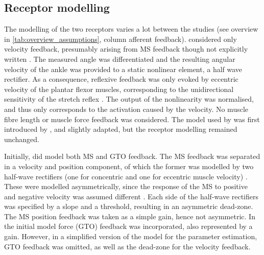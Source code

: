 
\subsection{Receptor modelling}
The modelling of the two receptors varies a lot between the studies (see overview in \autoref{tab:overview_assumptions}, column afferent feedback). \citeauthor{mirbagheri_intrinsic_2000} considered only velocity feedback, presumably arising from MS feedback though not explicitly written \cite{mirbagheri_intrinsic_2000}. The measured angle was differentiated and the resulting angular velocity of the ankle was provided to a static nonlinear element, a half wave rectifier. As a consequence, reflexive feedback was only evoked by eccentric velocity of the plantar flexor muscles, corresponding to the unidirectional sensitivity of the stretch reflex \cite{kearney_system_1983}. The output of the nonlinearity was normalised, and thus only corresponds to the activation caused by the velocity. No muscle fibre length or muscle force feedback was considered. The model used by \citeauthor{mirbagheri_intrinsic_2000} was first introduced by \citeauthor{kearney_identification_1997}, and slightly adapted, but the receptor modelling remained unchanged. 

Initially, \citeauthor{zhang_simultaneous_1997} did model both MS and GTO feedback. The MS feedback was separated in a velocity and position component, of which the former was modelled by two half-wave rectifiers (one for concentric and one for eccentric muscle velocity) \cite{zhang_simultaneous_1997}. These were modelled asymmetrically, since the response of the MS to positive and negative velocity was assumed different \cite{houk_neural_1981}. Each side of the half-wave rectifiers was specified by a slope and a threshold, resulting in an asymmetric dead-zone. The MS position feedback was taken as a simple gain, hence not asymmetric. In the initial model force (GTO) feedback was incorporated, also represented by a gain. However, in a simplified version of the model for the parameter estimation, GTO feedback was omitted, as well as the dead-zone for the velocity feedback. %

